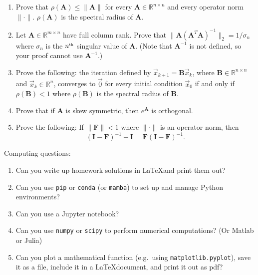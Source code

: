 \documentclass[11pt,fleqn]{article}
\newcommand{\mat}[1]{\mathbf{#1}}
\begin{document}
\begin{enumerate}
\item Prove that $\rho(\mat{A})\le \|\mat{A}\|$ for every $\mat{A}\in\mathbb{R}^{n\times n}$ and every operator norm $\|\cdot\|$. $\rho(\mat{A})$ is the spectral radius of $\mat{A}$.
\item Let $\mat{A}\in\mathbb{R}^{m\times n}$ have full column rank. Prove that $\|\mat{A}(\mat{A}^T\mat{A})^{-1}\|_2=1/\sigma_n$ where $\sigma_n$ is the $n^{\mbox{\tiny th}}$ singular value of $\mat{A}$. (Note that $\mat{A}^{-1}$ is not defined, so your proof cannot use $\mat{A}^{-1}$.)
\item Prove the following: the iteration defined by $\vec{x}_{k+1}=\mat{B}\vec{x}_k$, where $\mat{B}\in\mathbb{R}^{n\times n}$ and $\vec{x}_k\in\mathbb{R}^n$,  converges to $\vec{0}$ for every initial condition $\vec{x}_0$ if and only if $\rho(\mat{B})<1$ where $\rho(\mat{B})$ is the spectral radius of $\mat{B}$.
\item Prove that if $\mat{A}$ is skew symmetric, then $e^{\mat{A}}$ is orthogonal.
\item Prove the following: If $\|\mat{F}\|<1$ where $\|\cdot\|$ is an operator norm, then 
\[(\mat{I}-\mat{F})^{-1} - \mat{I} = \mat{F}(\mat{I}-\mat{F})^{-1}.\]
\end{enumerate}
Computing questions:
\begin{enumerate}
\item Can you write up homework solutions in \LaTeX and print them out?
\item Can you use {\tt pip} or {\tt conda} (or {\tt mamba}) to set up and manage Python environments?
\item Can you use a Jupyter notebook?
\item Can you use {\tt numpy} or {\tt scipy} to perform numerical computations? (Or Matlab or Julia)
\item Can you plot a mathematical function (e.g.\ using {\tt matplotlib.pyplot}), save it as a file, include it in a \LaTeX document, and print it out as pdf?
\end{enumerate}
 
\end{document}
